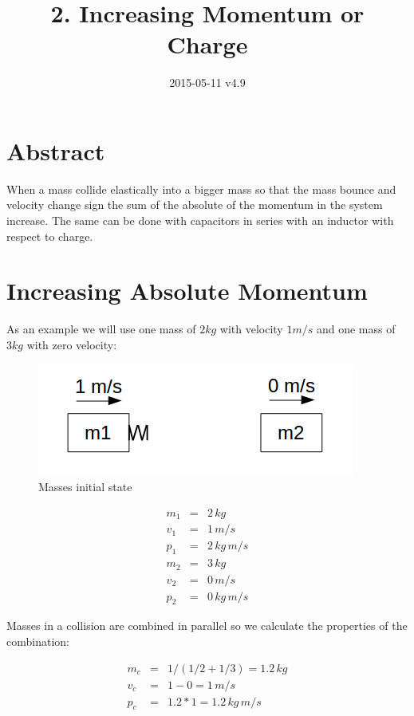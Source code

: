 \documentclass[]{../common/elementary-physics}
\title{2. Increasing Momentum or Charge}
\date{2015-05-11 v4.9}
\begin{document}
\maketitle

\tableofcontents

\section{Abstract}

When a mass collide elastically into a bigger mass so that the mass bounce and velocity change sign the sum of the absolute of the momentum in the system increase.
The same can be done with capacitors in series with an inductor with respect to charge.

\section{Increasing Absolute Momentum}

As an example we will use one mass of $2 kg$ with velocity $1 m/s$ and one mass of $3 kg$ with zero velocity:

\begin{figure}[ht] \centering
	\includegraphics[scale=.5]{mms4} \caption{Masses initial state}
\end{figure}

\begin{eqnarray}
m_1 &=& 2 \, kg \\
v_1 &=& 1 \, m/s \\
p_1 &=& 2 \, kg \, m/s \\
m_2 &=& 3 \, kg \\
v_2 &=& 0 \, m/s \\
p_2 &=& 0 \, kg \, m/s
\end{eqnarray}

Masses in a collision are combined in parallel\cite{masspar} so we calculate the properties of the combination:

\begin{eqnarray}
m_c &=& 1/(1/2 + 1/3) = 1.2 \, kg \\
v_c &=& 1 - 0 = 1 \, m/s \\
p_c &=& 1.2 * 1 = 1.2 \, kg \, m/s
\end{eqnarray}
\end{document}
